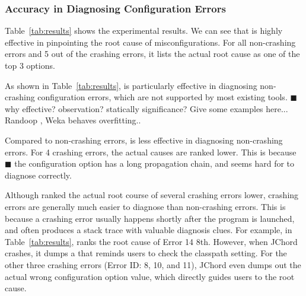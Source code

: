 \subsubsection{Accuracy in Diagnosing Configuration Errors}

Table~\ref{tab:results} shows the experimental results.
We can see that \ourtool is highly effective in pinpointing the root cause of
misconfigurations. For all \noncrash non-crashing errors
and 5 out of the \crash crashing errors, it lists the actual root cause as one of the
top 3 options. 


As shown in Table~\ref{tab:results}, \ourtool is particularly effective
in diagnosing non-crashing configuration errors, which are not supported
by most existing tools. $\blacksquare$ why effective? observation?
statically significance? Give some examples here... Randoop ,
Weka behaves overfitting..


Compared to non-crashing errors, \ourtool is less effective
in diagnosing non-crashing errors. For 4 crashing errors,
the actual causes are ranked lower.
This is because $\blacksquare$ the configuration option has
a long propagation chain, and seems hard for \ourtool
to diagnose correctly.

Although \ourtool ranked the actual root course of several
crashing errors lower, crashing errors are generally much easier to diagnose than non-crashing errors.
This is because a crashing error usually happens shortly after the program
is launched, and often produces a stack trace with valuable diagnosis clues.
For example, in Table~\ref{tab:results}, \ourtool ranks the root cause of
Error 14  8th.
However, when JChord crashes, it dumps a 
that reminds users to check the classpath setting. For the other three crashing errors (Error ID: 8, 10, and 11),
JChord even dumps out the actual wrong configuration option value, which
directly guides users to the root cause.





